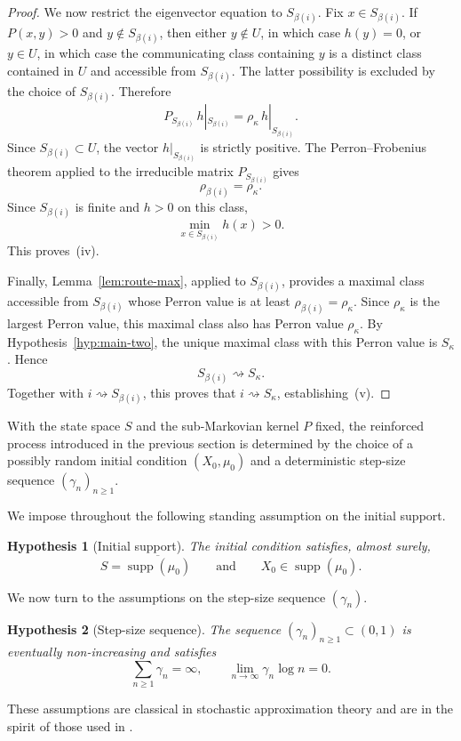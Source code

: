\documentclass[10pt,letterpaper]{article}
\newtheorem{hypothesis}{Hypothesis}
\theoremstyle{compactplain}
\theoremstyle{compactdefinition}
\DeclareMathOperator{\supp}{supp}
\newcommand{\1}{\mathds{1}}
\begin{document}
\begin{proof}
We now restrict the eigenvector equation to \(S_{\beta(i)}\). Fix
\(x\in S_{\beta(i)}\). If \(P(x,y)>0\) and \(y\notin S_{\beta(i)}\), then
either \(y\notin U\), in which case \(h(y)=0\), or \(y\in U\), in which case
the communicating class containing \(y\) is a distinct class contained in
\(U\) and accessible from \(S_{\beta(i)}\). The latter possibility is
excluded by the choice of \(S_{\beta(i)}\). Therefore
\[
P_{S_{\beta(i)}}\,h|_{S_{\beta(i)}}
=
\rho_\kappa\,h|_{S_{\beta(i)}}.
\]
Since \(S_{\beta(i)}\subset U\), the vector \(h|_{S_{\beta(i)}}\) is
strictly positive. The Perron--Frobenius theorem applied to the irreducible
matrix \(P_{S_{\beta(i)}}\) gives
\[
\rho_{\beta(i)}=\rho_\kappa.
\]
Since \(S_{\beta(i)}\) is finite and \(h>0\) on this class,
\[
\min_{x\in S_{\beta(i)}}h(x)>0.
\]
This proves~\textup{(iv)}.

Finally, Lemma~\ref{lem:route-max}, applied to \(S_{\beta(i)}\), provides a
maximal class accessible from \(S_{\beta(i)}\) whose Perron value is at least
\(\rho_{\beta(i)}=\rho_\kappa\). Since \(\rho_\kappa\) is the largest Perron
value, this maximal class also has Perron value \(\rho_\kappa\). By
Hypothesis~\ref{hyp:main-two}, the unique maximal class with this Perron value
is \(S_\kappa\). Hence
\[
S_{\beta(i)}\rightsquigarrow S_\kappa.
\]
Together with \(i\rightsquigarrow S_{\beta(i)}\), this proves that
\(i\rightsquigarrow S_\kappa\), establishing~\textup{(v)}.
\end{proof}



\medskip{}

With the state space \(S\) and the sub-Markovian kernel \(P\) fixed, the
reinforced process introduced in the previous section is determined by the
choice of a possibly random initial condition \((X_0,\mu_0)\) and a deterministic
step-size sequence \((\gamma_n)_{n\geq1}\).

We impose throughout the following standing assumption on the initial support.

\begin{hypothesis}[Initial support]
\label{hyp:initial-support}
The initial condition satisfies, almost surely,
\[
S=\overline{\supp(\mu_0)}
\qquad\text{and}\qquad
X_0\in\supp(\mu_0).
\]
\end{hypothesis}





We now turn to the assumptions on the step-size sequence \((\gamma_n)\). 


\begin{hypothesis}[Step-size sequence]
\label{hyp:gamma}
The sequence \((\gamma_n)_{n\geq1}\subset(0,1)\) is eventually non-increasing
and satisfies
\[
\sum_{n\geq1}\gamma_n=\infty,
\qquad
\lim_{n\to\infty}\gamma_n\log n=0.
\]
\end{hypothesis}
These assumptions are classical in stochastic approximation theory and are in
the spirit of those used in \cite{BC2015}.
\end{document}
